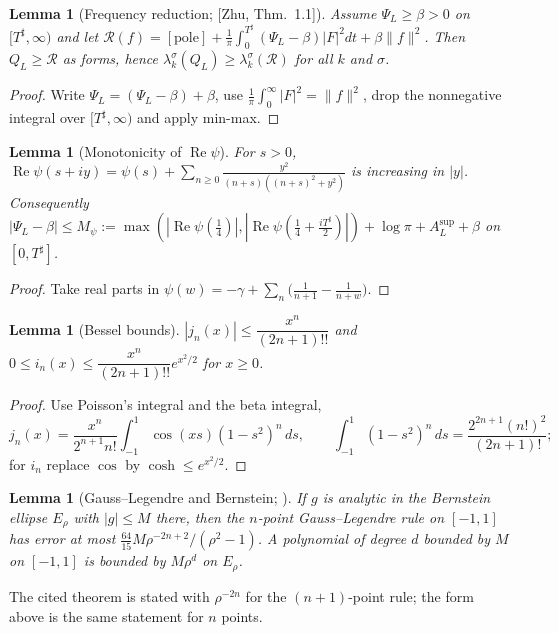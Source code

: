\documentclass[11pt]{amsart}
\newcommand{\re}{\operatorname{Re}}
\newcommand{\pole}{\mathrm{pole}}
\newcommand{\Tsh}{T^{\sharp}}
\newtheorem{lemma}[theorem]{Lemma}
\theoremstyle{definition}
\theoremstyle{remark}
\numberwithin{equation}{section}
\begin{document}
\begin{lemma}[Frequency reduction; {[Zhu, Thm.~1.1]}]\label{lem:R}
Assume $\Psi_L\ge\beta>0$ on $[\Tsh,\infty)$ and let $\mathcal R(f)=[\pole]+\frac1\pi\int_0^{\Tsh}(\Psi_L-\beta)|F|^2dt+\beta\|f\|^2$. Then $Q_L\ge\mathcal R$ as forms, hence $\lambda_k^\sigma(Q_L)\ge\lambda_k^\sigma(\mathcal R)$ for all $k$ and $\sigma$.
\end{lemma}
\begin{proof}
Write $\Psi_L=(\Psi_L-\beta)+\beta$, use $\frac1\pi\int_0^\infty|F|^2=\|f\|^2$, drop the nonnegative integral over $[\Tsh,\infty)$ and apply min-max.
\end{proof}

\begin{lemma}[Monotonicity of $\re\psi$]\label{lem:M}
For $s>0$, $\re\psi(s+iy)=\psi(s)+\sum_{n\ge0}\frac{y^2}{(n+s)((n+s)^2+y^2)}$ is increasing in $|y|$. Consequently $|\Psi_L-\beta|\le M_\psi:=\max(|\re\psi(\tfrac14)|,|\re\psi(\tfrac14+\tfrac{i\Tsh}2)|)+\log\pi+A_L^{\sup}+\beta$ on $[0,\Tsh]$.
\end{lemma}
\begin{proof}
Take real parts in $\psi(w)=-\gamma+\sum_n\bigl(\frac1{n+1}-\frac1{n+w}\bigr)$.
\end{proof}

\begin{lemma}[Bessel bounds]\label{lem:J}
$|j_n(x)|\le\dfrac{x^n}{(2n+1)!!}$ and $0\le i_n(x)\le\dfrac{x^n}{(2n+1)!!}e^{x^2/2}$ for $x\ge0$.
\end{lemma}
\begin{proof}
Use Poisson's integral and the beta integral,
\[
j_n(x)=\frac{x^n}{2^{n+1}n!}\int_{-1}^1\cos(xs)(1-s^2)^n\,ds,\qquad\int_{-1}^1(1-s^2)^n\,ds=\frac{2^{2n+1}(n!)^2}{(2n+1)!};
\]
for $i_n$ replace $\cos$ by $\cosh\le e^{x^2/2}$.
\end{proof}

\begin{lemma}[Gauss--Legendre and Bernstein; {\cite[Thm.~19.3]{Trefethen}}]\label{lem:G}
If $g$ is analytic in the Bernstein ellipse $E_\rho$ with $|g|\le M$ there, then the $n$-point Gauss--Legendre rule on $[-1,1]$ has error at most $\frac{64}{15}M\rho^{-2n+2}/(\rho^2-1)$. A polynomial of degree $d$ bounded by $M$ on $[-1,1]$ is bounded by $M\rho^d$ on $E_\rho$.
\end{lemma}
\noindent The cited theorem is stated with $\rho^{-2n}$ for the $(n+1)$-point rule; the form above is the same statement for $n$ points.
\end{document}
